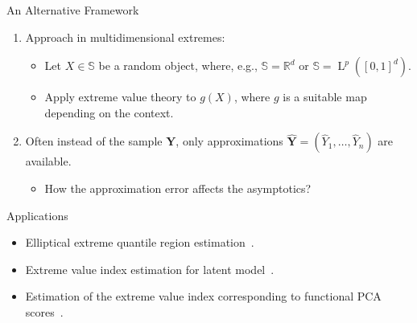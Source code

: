 \documentclass[11pt, aspectratio=169]{beamer}
\DeclareMathOperator{\lp}{L}
\begin{document}

\begin{frame}{An Alternative Framework}
  \begin{enumerate}
    \item Approach in multidimensional extremes:
    \begin{itemize}
      \item Let $X\in \mathbb{S}$ be a random object, where, e.g., $\mathbb{S} =
      \mathbb{R}^d$ or $\mathbb{S} = \lp^p([0,1]^d)$.
      \pause
      \item Apply extreme value theory to $g(X)$, where $g$ is a suitable map
      depending on the context.
    \end{itemize}
    \pause
    \item Often instead of the sample $\bm Y$, only approximations $\hat{\bm Y}
    = (\hat Y_1, \ldots, \hat Y_n)$ are available.
    \pause
    \begin{itemize}
      \item How the approximation error affects the asymptotics?
    \end{itemize}
  \end{enumerate}
\end{frame}


\begin{frame}{Applications}
  \begin{itemize}
    \item Elliptical extreme quantile region estimation~\parencite{pere2024}.
    \item Extreme value index estimation for latent model~\parencite{virta2024}.
    \item Estimation of the extreme value index corresponding to functional PCA
    scores~\parencite{kim2019}.
  \end{itemize}
\end{frame}

\end{document}
